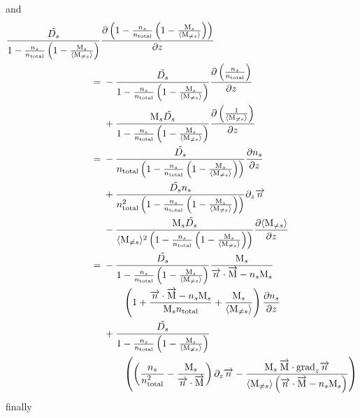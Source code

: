 and
\begin{equation}
\begin{split}
\frac{\tilde{D_s}}{1-\frac{n_s}{n_\text{total}}\left(1 - \frac{\text{M}_s}{\langle\text{M}_{\neq s}\rangle}\right)}
 &  \frac{\partial\left(1-\frac{n_s}{n_\text{total}}\left(1 - \frac{\text{M}_s}{\langle\text{M}_{\neq s}\rangle}\right)\right)}{\partial z} \\
        = &\; - \frac{\tilde{D_s}}{1-\frac{n_s}{n_\text{total}}\left(1 - \frac{\text{M}_s}{\langle\text{M}_{\neq s}\rangle}\right)}
                 \frac{\partial\left(\frac{n_s}{n_\text{total}}\right)}{\partial z}\\
          &\; + \frac{\text{M}_s\tilde{D_s}}{1-\frac{n_s}{n_\text{total}}\left(1 - \frac{\text{M}_s}{\langle\text{M}_{\neq s}\rangle}\right)}
                 \frac{\partial\left(\frac{1}{\langle\text{M}_{\neq s}\rangle}\right)}{\partial z}\\
        = &\; - \frac{\tilde{D_s}}{n_\text{total}\left(1-\frac{n_s}{n_\text{total}}\left(1 - \frac{\text{M}_s}{\langle\text{M}_{\neq s}\rangle}\right)\right)}
                 \frac{\partial n_s}{\partial z}\\
          &\; + \frac{\tilde{D_s}n_s}{n_\text{total}^2\left(1-\frac{n_s}{n_\text{total}}\left(1 - \frac{\text{M}_s}{\langle\text{M}_{\neq s}\rangle}\right)\right)}
                 \partial_{z}{\overrightarrow{n}}\\
          &\; - \frac{\text{M}_s\tilde{D_s}}{\langle\text{M}_{\neq s}\rangle^2\left(1-\frac{n_s}{n_\text{total}}\left(1 - \frac{\text{M}_s}{\langle\text{M}_{\neq s}\rangle}\right)\right)}
                 \frac{\partial\langle\text{M}_{\neq s}\rangle}{\partial z}\\
        = &\; - \frac{\tilde{D_s}}{1-\frac{n_s}{n_\text{total}}\left(1 - \frac{\text{M}_s}{\langle\text{M}_{\neq s}\rangle}\right)}
                  \frac{\text{M}_s}{\overrightarrow{n}\cdot\overrightarrow{\text{M}} - n_s\text{M}_s} \\
          &\;\qquad   \left(1 + \frac{\overrightarrow{n}\cdot\overrightarrow{\text{M}} - n_s\text{M}_s}{\text{M}_sn_\text{total}} + \frac{\text{M}_s}{\langle\text{M}_{\neq s}\rangle}\right) 
                        \frac{\partial n_s}{\partial z} \\
          &\; + \frac{\tilde{D_s}}{1-\frac{n_s}{n_\text{total}}\left(1 - \frac{\text{M}_s}{\langle\text{M}_{\neq s}\rangle}\right)} \\
          &\;\qquad \left(\left(\frac{n_s}{n_\text{total}^2} - \frac{\text{M}_s}{\overrightarrow{n}\cdot\overrightarrow{\text{M}}}\right)\partial_{z}{\overrightarrow{n}}
                        - \frac{\text{M}_s\:\overrightarrow{\text{M}}\cdot\text{grad}_{z}\overrightarrow{n}}
                               {\langle\text{M}_{\neq s}\rangle\left(\overrightarrow{n}\cdot\overrightarrow{\text{M}} - n_s\text{M}_s\right)}
                    \right)\\
\end{split}
\end{equation}
finally
